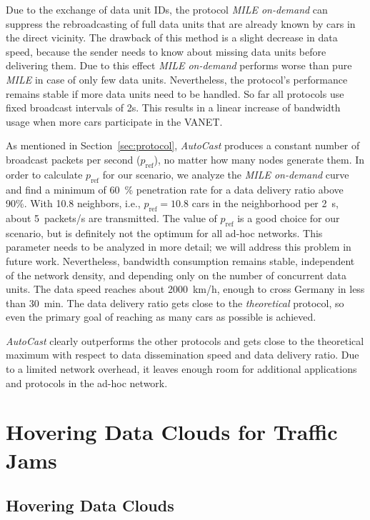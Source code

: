 \documentclass{acmrip}
\newcommand{\secref}[1]{Section~\ref{sec:#1}}
\newcommand{\AutoCast}[0]{{\em AutoCast} }
\begin{document}
Due to the exchange of data unit IDs, the protocol \textit{MILE
on-demand} can suppress the rebroadcasting of full data units that
are already known by cars in the direct vicinity. The drawback of
this method is a slight decrease in data speed, because the sender
needs to know about missing data units before delivering them. Due
to this effect \textit{MILE on-demand} performs worse than pure
\textit{MILE} in case of only few data units. Nevertheless, the
protocol's performance remains stable if more data units need to be
handled. So far all protocols use fixed broadcast intervals of 2s.
This results in a linear increase of bandwidth usage when
 more cars participate in the VANET.

\label{sec:results_autocast}

As mentioned in \secref{protocol}, \textit{AutoCast} produces a
constant number of broadcast packets per second
($p_{\mathrm{ref}}$), no matter how many nodes generate them. In
order to calculate $p_{\mathrm{ref}}$ for our scenario, we analyze
the \textit{MILE on-demand} curve and find a minimum of 60~\%
penetration rate for a data delivery ratio above 90\%. With 10.8
neighbors, i.e., $p_{\mathrm{ref}}=10.8$ cars in the neighborhood
per 2~s, about 5~packets/s are transmitted. The value of
$p_{\mathrm{ref}}$ is a good choice for our scenario, but is
definitely not the optimum for all ad-hoc networks. This parameter
needs to be analyzed in more detail; we will address this problem in
future work. Nevertheless, bandwidth consumption remains stable,
independent of the network density, and depending only on the number
of concurrent data units. The data speed reaches about 2000~km/h,
enough to cross Germany in less than 30~min. The data delivery ratio
gets close to the \textit{theoretical} protocol, so even the primary
goal of reaching as many cars as possible is achieved.

\AutoCast clearly outperforms the other protocols and gets close to
the theoretical maximum with respect to data dissemination speed and
data delivery ratio. Due to a limited network overhead, it leaves
enough room for additional applications and protocols in the ad-hoc
network.

\section{Hovering Data Clouds for Traffic Jams}
\subsection{Hovering Data Clouds}
\end{document}
